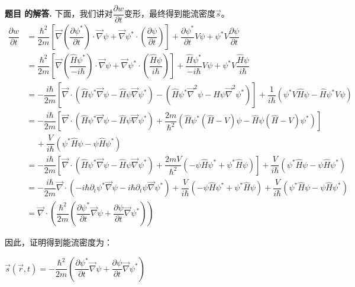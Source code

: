 \documentclass[12pt, a4paper, oneside]{ctexart}
\newcounter{problemname}
\newenvironment{solution}
  {\par\noindent\textbf{题目 \theproblemname 的解答. }}
  {\par}
\begin{document}
\begin{solution}
    下面，我们讲对$\dfrac{\partial w}{\partial t}$变形，最终得到能流密度$\vec{s}$。
    \begin{align*}
        \dfrac{\partial w}{\partial t} &= \dfrac{\hbar^2}{2m} \left[ \vec{\nabla} \left( \dfrac{\partial \psi^*}{\partial t}\right) \cdot \vec{\nabla} \psi +\vec{\nabla} \psi^* \cdot \left( \dfrac{\partial \psi}{\partial t}\right)\right] + \dfrac{\partial \psi^*}{\partial t} V \psi + \psi^* V \dfrac{\partial \psi}{\partial t}\\
        &= \dfrac{\hbar^2}{2m} \left[ \vec{\nabla} \left( \dfrac{\hat{H} \psi^*}{-i\hbar}\right) \cdot \vec{\nabla} \psi +\vec{\nabla} \psi^* \cdot \left( \dfrac{\hat{H} \psi}{i\hbar}\right)\right] + \dfrac{\hat{H} \psi^*}{-i\hbar} V \psi + \psi^* V \dfrac{\hat{H} \psi}{i\hbar}\\
        &= -\dfrac{i\hbar}{2m}\left[ \vec{\nabla} \cdot \left(\hat{H}\psi^* \vec{\nabla}\psi - \hat{H}\psi \vec{\nabla}\psi^* \right) - \left(\hat{H}\psi^* \vec{\nabla}^2\psi - \hat{H}\psi \vec{\nabla}^2\psi^*\right)\right] + \dfrac{1}{i\hbar} \left( \psi^* V \hat{H} \psi - \hat{H}\psi^* V \psi\right) \\
        &= -\dfrac{i\hbar}{2m}\left[ \vec{\nabla} \cdot \left(\hat{H}\psi^* \vec{\nabla}\psi - \hat{H}\psi \vec{\nabla}\psi^* \right) + \dfrac{2m}{\hbar^2} \left(\hat{H}\psi^* (\hat{H}-V) \psi - \hat{H}\psi (\hat{H}-V)\psi^*\right)\right] \\
        &\,\,\,\,\,\,\,+ \dfrac{V}{i\hbar} \left( \psi^*  \hat{H} \psi - \psi \hat{H}\psi^*  \right) \\
        &= -\dfrac{i\hbar}{2m}\left[ \vec{\nabla} \cdot \left(\hat{H}\psi^* \vec{\nabla}\psi - \hat{H}\psi \vec{\nabla}\psi^* \right) + \dfrac{2mV}{\hbar^2} \left(-\psi\hat{H}\psi^*  + \psi^*\hat{H}\psi \right)\right]+ \dfrac{V}{i\hbar} \left( \psi^*  \hat{H} \psi - \psi \hat{H}\psi^*  \right)\\
        &= -\dfrac{i\hbar}{2m} \vec{\nabla} \cdot \left(-i\hbar\partial_t\psi^* \vec{\nabla}\psi - i\hbar \partial_t\psi \vec{\nabla}\psi^* \right) + \dfrac{V}{i\hbar} \left(-\psi\hat{H}\psi^*  + \psi^*\hat{H}\psi \right)+ \dfrac{V}{i\hbar} \left( \psi^*  \hat{H} \psi - \psi \hat{H}\psi^*  \right)\\
        &= \vec{\nabla} \cdot \left(\dfrac{\hbar^2}{2m} \left( \dfrac{\partial \psi^*}{\partial t} \vec{\nabla} \psi +  \dfrac{\partial \psi}{\partial t} \vec{\nabla} \psi^* \right)\right) 
    \end{align*}

    因此，证明得到能流密度为：

    \centerline{$\vec{s}(\vec{r},t) = -\dfrac{\hbar^2}{2m} \left( \dfrac{\partial \psi^*}{\partial t} \vec{\nabla} \psi +  \dfrac{\partial \psi}{\partial t} \vec{\nabla} \psi^* \right)$}
\end{solution}
\end{document}
